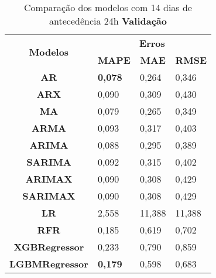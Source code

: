 \begin{table}[H]
	\centering
	\caption{Comparação dos modelos com 14 dias de antecedência 24h \textbf{Validação} }\label{tb:30-24vld}
	\begin{tabular}{@{}clll@{}}
		\toprule
		\multirow{2}{*}{\textbf{Modelos}} & \multicolumn{3}{c}{\textbf{Erros}}                                                                       \\ \cmidrule(l){2-4} 
		& \multicolumn{1}{c}{\textbf{MAPE}} & \multicolumn{1}{c}{\textbf{MAE}} & \multicolumn{1}{c}{\textbf{RMSE}} \\ \hline
\textbf{AR}                       & \textbf{0,078}                             & 0,264                            & 0,346                             \\
\textbf{ARX}                      & 0,090                             & 0,309                            & 0,430                             \\
\textbf{MA}                       & 0,079                             & 0,265                            & 0,349                             \\
\textbf{ARMA}                     & 0,093                             & 0,317                            & 0,403                             \\
\textbf{ARIMA}                    & 0,088                             & 0,295                            & 0,389                             \\
\textbf{SARIMA}                   & 0,092                             & 0,315                            & 0,402                             \\
\textbf{ARIMAX}                   & 0,090                             & 0,308                            & 0,429                             \\
\textbf{SARIMAX}                  & 0,090                             & 0,308                            & 0,429                             \\
\textbf{LR}                       & 2,558                             & 11,388                           & 11,388                            \\
\textbf{RFR}                      & 0,185                             & 0,619                            & 0,702                             \\
\textbf{XGBRegressor}             & 0,233                             & 0,790                            & 0,859                             \\
\textbf{LGBMRegressor}            & \textbf{0,179}                             & 0,598                            & 0,683                             \\ \bottomrule
	\end{tabular}

\end{table}

